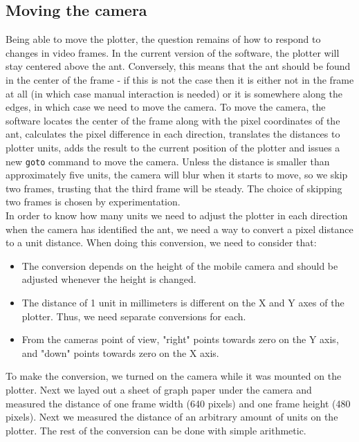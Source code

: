 \subsection{Moving the camera}
Being able to move the plotter, the question remains of how to respond to changes in video frames. In the current version of the software, the plotter will stay centered above the ant. Conversely, this means that the ant should be found in the center of the frame - if this is not the case then it is either not in the frame at all (in which case manual interaction is needed) or it is somewhere along the edges, in which case we need to move the camera. To move the camera, the software locates the center of the frame along with the pixel coordinates of the ant, calculates the pixel difference in each direction, translates the distances to plotter units, adds the result to the current position of the plotter and issues a new \texttt{goto} command to move the camera. Unless the distance is smaller than approximately five units, the camera will blur when it starts to move, so we skip two frames, trusting that the third frame will be steady. The choice of skipping two frames is chosen by experimentation.\\

In order to know how many units we need to adjust the plotter in each direction when the camera has identified the ant, we need a way to convert a pixel distance to a unit distance. When doing this conversion, we need to consider that:

\begin{itemize}
  \item The conversion depends on the height of the mobile camera and should be adjusted whenever the height is changed.
  \item The distance of 1 unit in millimeters is different on the X and Y axes of the plotter. Thus, we need separate conversions for each.
  \item From the cameras point of view, "right" points towards zero on the Y axis, and "down" points towards zero on the X axis.
\end{itemize}

To make the conversion, we turned on the camera while it was mounted on the plotter. Next we layed out a sheet of graph paper under the camera and measured the distance of one frame width (640 pixels) and one frame height (480 pixels). Next we measured the distance of an arbitrary amount of units on the plotter. The rest of the conversion can be done with simple arithmetic. \\

